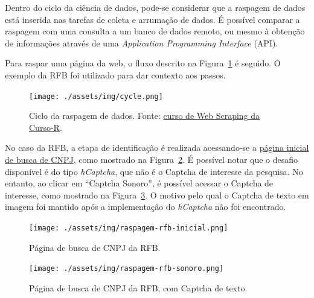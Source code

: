 \documentclass[12pt,twoside,brazilian]{book}
\begin{document}
Dentro do ciclo da ciência de dados, pode-se considerar que a raspagem
de dados está inserida nas tarefas de coleta e arrumação de dados. É
possível comparar a raspagem com uma consulta a um banco de dados
remoto, ou mesmo à obtenção de informações através de uma
\emph{Application Programming Interface} (API).

Para raspar uma página da web, o fluxo descrito na
Figura~\ref{fig-fluxo-web-scraping} é seguido. O exemplo da RFB foi
utilizado para dar contexto aos passos.

\begin{figure}

{\centering \texttt{[image: ./assets/img/cycle.png]}

}

\caption{\label{fig-fluxo-web-scraping}Ciclo da raspagem de dados.
Fonte: \href{https://curso-r.github.io/main-web-scraping}{curso de Web
Scraping da Curso-R}.}

\end{figure}

No caso da RFB, a etapa de identificação é realizada acessando-se a
\href{http://servicos.receita.fazenda.gov.br/Servicos/cnpjreva/Cnpjreva_Solicitacao.asp}{página
inicial de busca de CNPJ}, como mostrado na
Figura~\ref{fig-raspagem-rfb-inicial}. É possível notar que o desafio
disponível é do tipo \emph{hCaptcha}, que não é o Captcha de interesse
da pesquisa. No entanto, ao clicar em ``Captcha Sonoro'', é possível
acessar o Captcha de interesse, como mostrado na
Figura~\ref{fig-raspagem-rfb-sonoro}. O motivo pelo qual o Captcha de
texto em imagem foi mantido após a implementação do \emph{hCaptcha} não
foi encontrado.

\begin{figure}

{\centering \texttt{[image: ./assets/img/raspagem-rfb-inicial.png]}

}

\caption{\label{fig-raspagem-rfb-inicial}Página de busca de CNPJ da
RFB.}

\end{figure}

\begin{figure}

{\centering \texttt{[image: ./assets/img/raspagem-rfb-sonoro.png]}

}

\caption{\label{fig-raspagem-rfb-sonoro}Página de busca de CNPJ da RFB,
com Captcha de texto.}

\end{figure}
\end{document}
